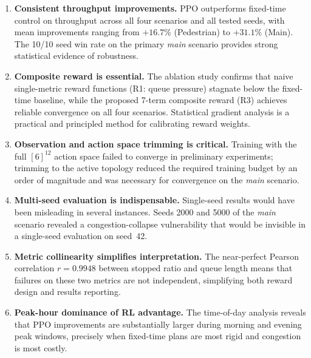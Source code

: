 \documentclass[12pt,oneside,a4paper]{report}
\newcommand{\ppo}{\textsc{PPO}}
\begin{document}
\begin{enumerate}[leftmargin=*]

  \item \textbf{Consistent throughput improvements.}
        \ppo{} outperforms fixed-time control on throughput across
        all four scenarios and all tested seeds, with mean
        improvements ranging from $+16.7\%$ (Pedestrian) to
        $+31.1\%$ (Main).  The 10/10 seed win rate on the primary
        \textit{main} scenario provides strong statistical evidence
        of robustness.

  \item \textbf{Composite reward is essential.}
        The ablation study confirms that naive single-metric reward
        functions (R1: queue pressure) stagnate below the fixed-time
        baseline, while the proposed 7-term composite reward (R3)
        achieves reliable convergence on all four scenarios.
        Statistical gradient analysis is a practical and principled
        method for calibrating reward weights.

  \item \textbf{Observation and action space trimming is critical.}
        Training with the full $[6]^{12}$ action space failed to
        converge in preliminary experiments; trimming to the
        active topology reduced the required training budget by
        an order of magnitude and was necessary for convergence
        on the \textit{main} scenario.

  \item \textbf{Multi-seed evaluation is indispensable.}
        Single-seed results would have been misleading in several
        instances.  Seeds 2000 and 5000 of the \textit{main} scenario
        revealed a congestion-collapse vulnerability that would be
        invisible in a single-seed evaluation on seed~42.

  \item \textbf{Metric collinearity simplifies interpretation.}
        The near-perfect Pearson correlation $r=0.9948$ between
        stopped ratio and queue length means that failures on these
        two metrics are not independent, simplifying both reward
        design and results reporting.

  \item \textbf{Peak-hour dominance of RL advantage.}
        The time-of-day analysis reveals that \ppo{} improvements
        are substantially larger during morning and evening peak
        windows, precisely when fixed-time plans are most rigid
        and congestion is most costly.

\end{enumerate}
\end{document}

